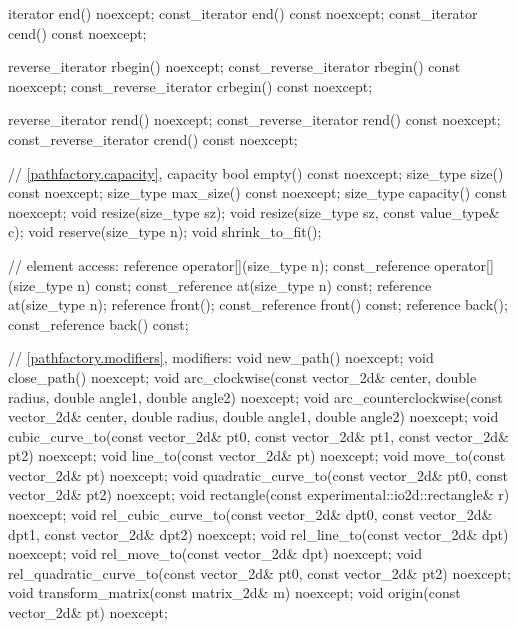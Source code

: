 \begin{codeblock}
{{{{{    iterator end() noexcept;
    const_iterator end() const noexcept;
    const_iterator cend() const noexcept;
    
    reverse_iterator rbegin() noexcept;
    const_reverse_iterator rbegin() const noexcept;
    const_reverse_iterator crbegin() const noexcept;

    reverse_iterator rend() noexcept;
    const_reverse_iterator rend() const noexcept;
    const_reverse_iterator crend() const noexcept;
    
    // \ref{pathfactory.capacity}, capacity
    bool empty() const noexcept;
    size_type size() const noexcept;
    size_type max_size() const noexcept;
    size_type capacity() const noexcept;
    void resize(size_type sz);
    void resize(size_type sz, const value_type& c);
    void reserve(size_type n);
    void shrink_to_fit();

    // element access:
    reference operator[](size_type n);
    const_reference operator[](size_type n) const;
    const_reference at(size_type n) const;
    reference at(size_type n);
    reference front();
    const_reference front() const;
    reference back();
    const_reference back() const;

    // \ref{pathfactory.modifiers}, modifiers:
    void new_path() noexcept;
    void close_path() noexcept;
    void arc_clockwise(const vector_2d& center, double radius, double angle1,
    double angle2) noexcept;
    void arc_counterclockwise(const vector_2d& center, double radius,
    double angle1, double angle2) noexcept;
    void cubic_curve_to(const vector_2d& pt0, const vector_2d& pt1,
    const vector_2d& pt2) noexcept;
    void line_to(const vector_2d& pt) noexcept;
    void move_to(const vector_2d& pt) noexcept;
    void quadratic_curve_to(const vector_2d& pt0, const vector_2d& pt2)
    noexcept;
    void rectangle(const experimental::io2d::rectangle& r) noexcept;
    void rel_cubic_curve_to(const vector_2d& dpt0, const vector_2d& dpt1,
    const vector_2d& dpt2) noexcept;
    void rel_line_to(const vector_2d& dpt) noexcept;
    void rel_move_to(const vector_2d& dpt) noexcept;
    void rel_quadratic_curve_to(const vector_2d& pt0, const vector_2d& pt2)
    noexcept;
    void transform_matrix(const matrix_2d& m) noexcept;
    void origin(const vector_2d& pt) noexcept;
    
}}}}}
\end{codeblock}

